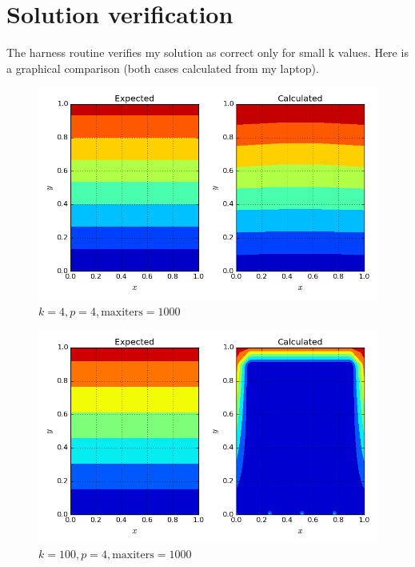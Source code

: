 \documentclass[12pt,letterpaper]{article}
\begin{document}
\section*{Solution verification}
\noindent The harness routine verifies my solution as correct only for small k values. Here is a graphical comparison (both cases calculated from my laptop).
%
\begin{figure}[h]
\centering
\includegraphics[scale = 0.45]{verify_k4.png}
\caption{$k = 4, p = 4, \mathrm{ maxiters} = 1000$}
\end{figure}
%
\begin{figure}
\centering
\includegraphics[scale = 0.45]{verify_k100.png}
\caption{$k = 100, p = 4, \mathrm{maxiters} = 1000$}
\end{figure}
\end{document}
